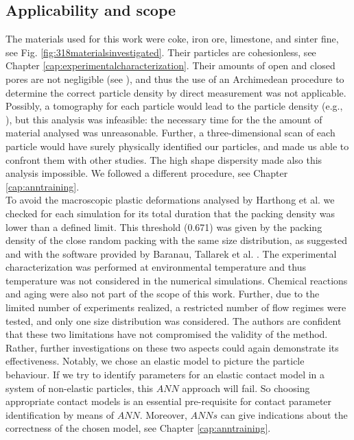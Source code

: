 


\subsection{Applicability and scope}
\label{subsec:applicability}



The materials used for this work were coke, iron ore, limestone, and sinter
fine, see Fig. \ref{fig:318materialsinvestigated}. 
Their particles are
cohesionless, see Chapter \ref{cap:experimentalcharacterization}.
Their amounts of open and closed pores are not negligible (see
\citet{RefWorks:191}), 
and thus the use of an Archimedean procedure to determine the correct particle density by direct measurement
was not applicable.
Possibly, a tomography for each particle would lead to the particle density
(e.g., \citet{RefWorks:77}), but this analysis was infeasible: 
the necessary time for the the amount of material
analysed was unreasonable. 
Further, a three-dimensional scan of each particle would have surely physically
identified our particles, and made us able to confront them with other studies. 
The high shape dispersity made also this analysis impossible. 
We followed a different procedure, see Chapter \ref{cap:anntraining}.\\
To avoid the macroscopic plastic deformations analysed by Harthong et al. \cite{RefWorks:183} 
we checked for each simulation for its total duration that the packing density was 
lower than a defined limit. 
This threshold (0.671) was given by the packing density of the close random packing with the 
same size distribution, as suggested and with the software provided by Baranau, Tallarek 
et al. \cite{RefWorks:182, RefWorks:185}.
The experimental characterization was performed at environmental temperature and thus 
temperature was not considered in the numerical simulations. Chemical reactions and aging 
were also not part of the scope of this work.
Further, due to the limited number of experiments realized, a restricted number
of flow regimes were tested, and only one size distribution was considered. 
The authors are confident that these two limitations have not compromised the validity of the method. 
Rather, further investigations on these two aspects could again demonstrate its effectiveness. 
Notably, we chose an elastic model to picture the particle behaviour. If we try
to identify parameters for an elastic contact model in a system of non-elastic particles, this $ANN$ approach will fail. 
So choosing appropriate contact models is an essential pre-requisite for contact 
parameter identification by means of $ANN$. 
Moreover, $ANNs$ can give indications about the correctness of the chosen model, 
see Chapter \ref{cap:anntraining}.